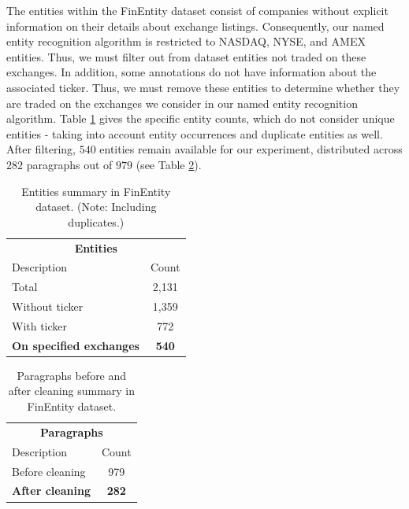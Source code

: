 The entities within the FinEntity dataset consist of companies without explicit information on their details about exchange listings. Consequently, our named entity recognition algorithm is restricted to NASDAQ, NYSE, and AMEX entities. Thus, we must filter out from dataset entities not traded on these exchanges. In addition, some annotations do not have information about the associated ticker. Thus, we must remove these entities to determine whether they are traded on the exchanges we consider in our named entity recognition algorithm. Table \ref{table:elsa-entities-finentity-summary} gives the specific entity counts, which do not consider unique entities - taking into account entity occurrences and duplicate entities as well. After filtering, $540$ entities remain available for our experiment, distributed across $282$ paragraphs out of $979$ (see Table \ref{table:elsa-paragraphs-finentity-summary}).

\begin{table}[ht]
    \centering
    \caption{Entities summary in FinEntity dataset. (Note: Including duplicates.)}
    \label{table:elsa-entities-finentity-summary}
    \begin{tabular}{l c}
        \hline
        \multicolumn{2}{c}{\textbf{Entities}} \\
        \cline{1-2}
        Description & Count \\
        \hline
        Total & 2,131 \\
        Without ticker & 1,359 \\
        With ticker & 772 \\
        \textbf{On specified exchanges} & \textbf{540} \\
        \hline
    \end{tabular}
\end{table}

\begin{table}[ht]
    \centering
    \caption{Paragraphs before and after cleaning summary in FinEntity dataset.}
    \label{table:elsa-paragraphs-finentity-summary}
    \begin{tabular}{l c}
        \hline
        \multicolumn{2}{c}{\textbf{Paragraphs}} \\
        \cline{1-2}
        Description & Count \\
        \hline
        Before cleaning & 979 \\
        \textbf{After cleaning} & \textbf{282} \\
        \hline
    \end{tabular}
\end{table}


